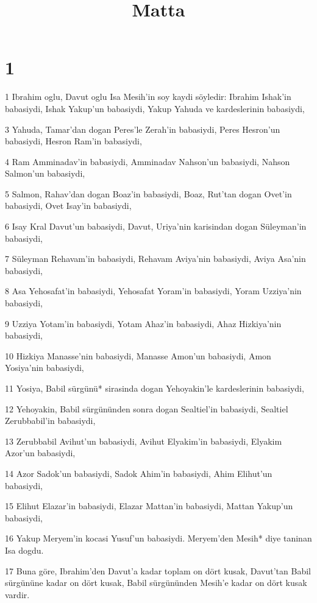 

\title{Matta}


\chapter{1}

\par 1 Ibrahim oglu, Davut oglu Isa Mesih'in soy kaydi söyledir: Ibrahim Ishak'in babasiydi, Ishak Yakup'un babasiydi, Yakup Yahuda ve kardeslerinin babasiydi,
\par 3 Yahuda, Tamar'dan dogan Peres'le Zerah'in babasiydi, Peres Hesron'un babasiydi, Hesron Ram'in babasiydi,
\par 4 Ram Amminadav'in babasiydi, Amminadav Nahson'un babasiydi, Nahson Salmon'un babasiydi,
\par 5 Salmon, Rahav'dan dogan Boaz'in babasiydi, Boaz, Rut'tan dogan Ovet'in babasiydi, Ovet Isay'in babasiydi,
\par 6 Isay Kral Davut'un babasiydi, Davut, Uriya'nin karisindan dogan Süleyman'in babasiydi,
\par 7 Süleyman Rehavam'in babasiydi, Rehavam Aviya'nin babasiydi, Aviya Asa'nin babasiydi,
\par 8 Asa Yehosafat'in babasiydi, Yehosafat Yoram'in babasiydi, Yoram Uzziya'nin babasiydi,
\par 9 Uzziya Yotam'in babasiydi, Yotam Ahaz'in babasiydi, Ahaz Hizkiya'nin babasiydi,
\par 10 Hizkiya Manasse'nin babasiydi, Manasse Amon'un babasiydi, Amon Yosiya'nin babasiydi,
\par 11 Yosiya, Babil sürgünü* sirasinda dogan Yehoyakin'le kardeslerinin babasiydi,
\par 12 Yehoyakin, Babil sürgününden sonra dogan Sealtiel'in babasiydi, Sealtiel Zerubbabil'in babasiydi,
\par 13 Zerubbabil Avihut'un babasiydi, Avihut Elyakim'in babasiydi, Elyakim Azor'un babasiydi,
\par 14 Azor Sadok'un babasiydi, Sadok Ahim'in babasiydi, Ahim Elihut'un babasiydi,
\par 15 Elihut Elazar'in babasiydi, Elazar Mattan'in babasiydi, Mattan Yakup'un babasiydi,
\par 16 Yakup Meryem'in kocasi Yusuf'un babasiydi. Meryem'den Mesih* diye taninan Isa dogdu.
\par 17 Buna göre, Ibrahim'den Davut'a kadar toplam on dört kusak, Davut'tan Babil sürgününe kadar on dört kusak, Babil sürgününden Mesih'e kadar on dört kusak vardir.
